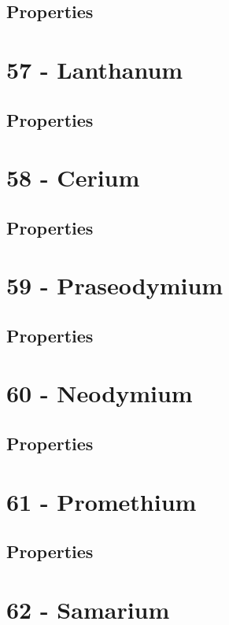 \documentclass{book}
\begin{document}
\subsection{Properties}

\section{57 - Lanthanum}
\label{sec:elem-lanthanum}
\subsection{Properties}

\section{58 - Cerium}
\label{sec:elem-cerium}
\subsection{Properties}

\section{59 - Praseodymium}
\label{sec:elem-praseodymium}
\subsection{Properties}

\section{60 - Neodymium}
\label{sec:elem-neodymium}
\subsection{Properties}

\section{61 - Promethium}
\label{sec:elem-promethium}
\subsection{Properties}

\section{62 - Samarium}
\label{sec:elem-samarium}
\end{document}
